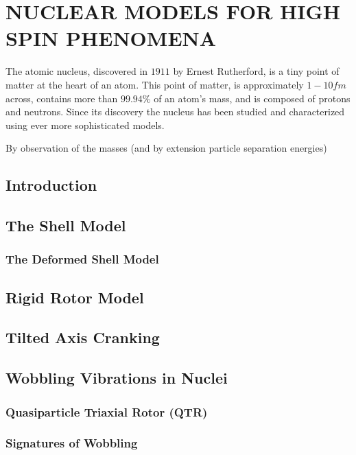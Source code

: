 %
%

\chapter{NUCLEAR MODELS FOR HIGH SPIN PHENOMENA}
\label{chp:models}
The atomic nucleus, discovered in $1911$ by Ernest Rutherford\cite{rutherfordNuclearModel}, is a tiny point of matter at the heart of an atom. This point of matter, is approximately $1-10fm$ across, contains more than $99.94\%$ of an atom's mass, and is composed of protons and neutrons. Since its discovery the nucleus has been studied and characterized using ever more sophisticated models.

By observation of the masses (and by extension particle separation energies)
\section{Introduction}
\label{sec:models-into}
\section{The Shell Model}
\label{sec:models-shell-model}
\subsection{The Deformed Shell Model}
\label{ssec:models-shell-model-def-sm}
\section{Rigid Rotor Model}
\label{sec:models-rigid-rotor}

\section{Tilted Axis Cranking}
\label{sec:models-tac}

\section{Wobbling Vibrations in Nuclei}
\label{sec:models-wobbling}
\subsection{Quasiparticle Triaxial Rotor (QTR)}
\label{sec:models-qtr}
\subsection{Signatures of Wobbling}
\label{sec:models-sig}
